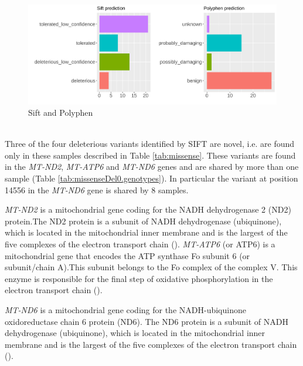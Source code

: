 \begin{figure}[H]
\includegraphics[width=\textwidth]{Fig/plots2.png}
\caption{Sift and Polyphen}
\label{fig:siftpolyphen}
\end{figure}\\

Three of the four deleterious variants identified by SIFT are novel, i.e. are found only in these samples  described in Table \ref{tab:missense}. %
These variants are found in the \textit {MT-ND2}, \textit{MT-ATP6} and
\textit{MT-ND6} genes and are shared by more than one sample (Table \ref{tab:missenseDel0.genotypes}). In particular the variant at position 14556 in the \textit{MT-ND6} gene is shared by 8 samples. 


\textit{MT-ND2} is a mitochondrial gene coding for the NADH dehydrogenase 2 (ND2) protein.The ND2 protein is a subunit of NADH dehydrogenase (ubiquinone), which is located in the mitochondrial inner membrane and is the largest of the five complexes of the
electron transport chain (\cite{ncbi2016database}). \textit{MT-ATP6} (or ATP6) is a mitochondrial gene that encodes the ATP synthase Fo subunit 6 (or subunit/chain A).This subunit belongs to the Fo complex of the complex V. This enzyme is responsible for the final step of oxidative phosphorylation in the electron transport chain (\cite{ncbi2016database}). 


\textit{MT-ND6} is a mitochondrial gene coding for the NADH-ubiquinone oxidoreductase chain 6 protein (ND6). The ND6 protein is a subunit of NADH dehydrogenase (ubiquinone), which is located in the mitochondrial inner membrane and is the largest of
the five complexes of the electron transport chain (\cite{ncbi2016database}).



